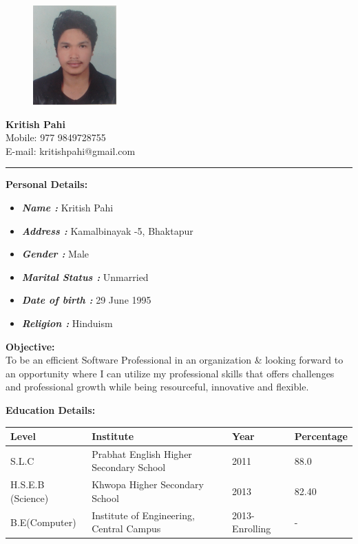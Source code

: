 \documentclass[paper = a4paper, 12pt]{article}
\begin{document}
\pagestyle{empty}

\begin{figure}
	\includegraphics[height=1.5in]{k}
\end{figure}


{\Huge
	\textbf{Kritish Pahi} \\}
	\small{Mobile: 977 9849728755}\\
	\small{E-mail: kritishpahi@gmail.com}\\

	
\begin{figure}\end{figure}
 \rule[2pt]{\textwidth}{1pt}


{ \Large \textbf{Personal Details:}\\
}
\begin{itemize}\addtolength{\leftskip}{8mm}

	\item \textbf{\emph{Name :}} Kritish Pahi
	\item \textbf{\emph{Address :}} Kamalbinayak -5, Bhaktapur
	\item \textbf{\emph{Gender :}} Male
	\item \textbf{\emph{Marital Status :}} Unmarried
	\item \textbf{\emph{Date of birth :}} 29 June 1995
	\item \textbf{\emph{Religion :}} Hinduism
\end{itemize}
\vspace{8mm}

{\Large \textbf{Objective:} \\
}
To be an efficient Software Professional in an organization \& looking forward
to an opportunity where I can utilize my professional skills that offers 
challenges and professional growth while being resourceful, innovative 
and flexible.

\vspace{8mm}
{\Large \textbf{ Education Details: } \\
}
\begin{tabular}{l l l l}
	\textbf{Level} & \textbf{Institute} &\textbf{Year} & \textbf{Percentage} \\ \hline
	S.L.C & Prabhat English Higher Secondary School & 2011 & 88.0 \\ \hline
	H.S.E.B (Science) & Khwopa Higher Secondary School & 2013 & 82.40 \\ \hline
	B.E(Computer) & Institute of Engineering, Central Campus & 2013-Enrolling & - \\ \hline
\end{tabular}
\end{document}
